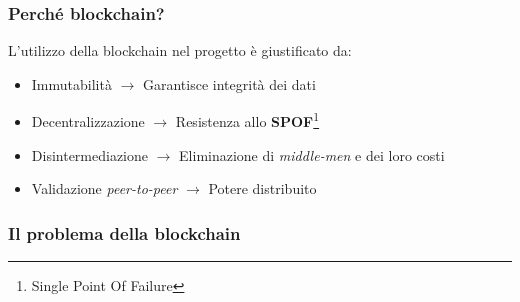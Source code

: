 \documentclass{beamer}
\begin{document}
\begin{frame}
	\frametitle{Perché blockchain?}
	L'utilizzo della blockchain nel progetto è giustificato da:
	\begin{itemize}[<+->]
		\item Immutabilità \(\rightarrow\) Garantisce integrità dei dati
		\item Decentralizzazione \(\rightarrow\) Resistenza allo \textbf{SPOF}\footnote{Single Point Of Failure}
		\item Disintermediazione \(\rightarrow\) Eliminazione di \emph{middle-men} e dei loro costi
		\item Validazione \emph{peer-to-peer} \(\rightarrow\) Potere distribuito
	\end{itemize}
\end{frame}

\begin{frame}
	\frametitle{Il problema della blockchain}
	
\end{frame}
\end{document}
